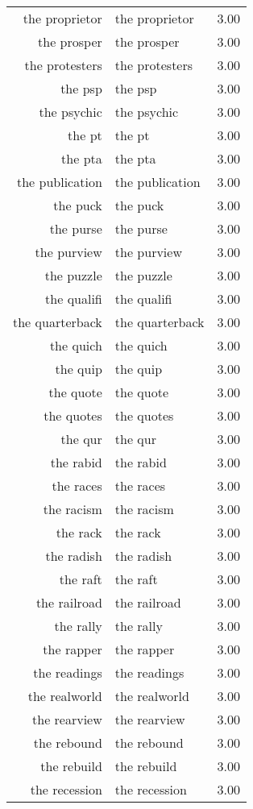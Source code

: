 \begin{table}[ht]
\begin{tabular}{rlr}
  the proprietor & the proprietor & 3.00 \\ 
  the prosper & the prosper & 3.00 \\ 
  the protesters & the protesters & 3.00 \\ 
  the psp & the psp & 3.00 \\ 
  the psychic & the psychic & 3.00 \\ 
  the pt & the pt & 3.00 \\ 
  the pta & the pta & 3.00 \\ 
  the publication & the publication & 3.00 \\ 
  the puck & the puck & 3.00 \\ 
  the purse & the purse & 3.00 \\ 
  the purview & the purview & 3.00 \\ 
  the puzzle & the puzzle & 3.00 \\ 
  the qualifi & the qualifi & 3.00 \\ 
  the quarterback & the quarterback & 3.00 \\ 
  the quich & the quich & 3.00 \\ 
  the quip & the quip & 3.00 \\ 
  the quote & the quote & 3.00 \\ 
  the quotes & the quotes & 3.00 \\ 
  the qur & the qur & 3.00 \\ 
  the rabid & the rabid & 3.00 \\ 
  the races & the races & 3.00 \\ 
  the racism & the racism & 3.00 \\ 
  the rack & the rack & 3.00 \\ 
  the radish & the radish & 3.00 \\ 
  the raft & the raft & 3.00 \\ 
  the railroad & the railroad & 3.00 \\ 
  the rally & the rally & 3.00 \\ 
  the rapper & the rapper & 3.00 \\ 
  the readings & the readings & 3.00 \\ 
  the realworld & the realworld & 3.00 \\ 
  the rearview & the rearview & 3.00 \\ 
  the rebound & the rebound & 3.00 \\ 
  the rebuild & the rebuild & 3.00 \\ 
  the recession & the recession & 3.00 \\ 

\end{tabular}
\end{table}
